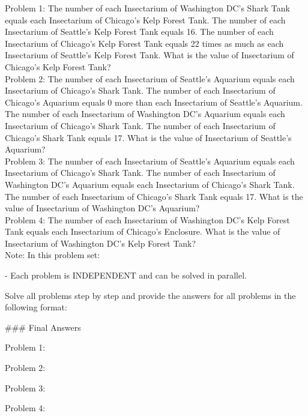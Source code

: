 \begin{systemprompt}[title={Question}]
Problem 1: The number of each Insectarium of Washington DC's Shark Tank equals each Insectarium of Chicago's Kelp Forest Tank. The number of each Insectarium of Seattle's Kelp Forest Tank equals 16. The number of each Insectarium of Chicago's Kelp Forest Tank equals 22 times as much as each Insectarium of Seattle's Kelp Forest Tank. What is the value of Insectarium of Chicago's Kelp Forest Tank?\\

Problem 2: The number of each Insectarium of Seattle's Aquarium equals each Insectarium of Chicago's Shark Tank. The number of each Insectarium of Chicago's Aquarium equals 0 more than each Insectarium of Seattle's Aquarium. The number of each Insectarium of Washington DC's Aquarium equals each Insectarium of Chicago's Shark Tank. The number of each Insectarium of Chicago's Shark Tank equals 17. What is the value of Insectarium of Seattle's Aquarium?\\

Problem 3: The number of each Insectarium of Seattle's Aquarium equals each Insectarium of Chicago's Shark Tank. The number of each Insectarium of Washington DC's Aquarium equals each Insectarium of Chicago's Shark Tank. The number of each Insectarium of Chicago's Shark Tank equals 17. What is the value of Insectarium of Washington DC's Aquarium?\\

Problem 4: The number of each Insectarium of Washington DC's Kelp Forest Tank equals each Insectarium of Chicago's Enclosure. What is the value of Insectarium of Washington DC's Kelp Forest Tank?\\

Note: In this problem set:

- Each problem is INDEPENDENT and can be solved in parallel.

Solve all problems step by step and provide the answers for all problems in the following format:

\#\#\# Final Answers

Problem 1: \boxed{[answer1]}

Problem 2: \boxed{[answer2]}

Problem 3: \boxed{[answer3]}

Problem 4: \boxed{[answer4]}
\end{systemprompt}

